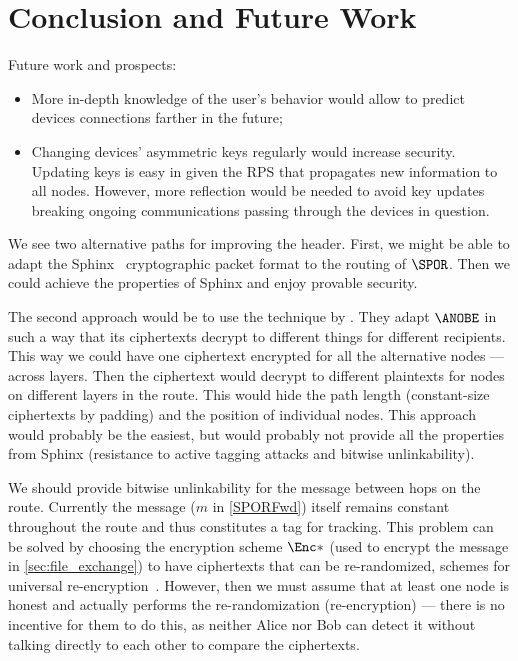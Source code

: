 \section{Conclusion and Future Work}

 Future work and prospects:
\begin{itemize}
	\item More in-depth knowledge of the user's behavior would allow to predict devices connections farther in the future;
	\item Changing devices' asymmetric keys regularly would increase security.
	Updating keys is easy in \name given the RPS that propagates new information to all nodes.
	However, more reflection would be needed to avoid key updates breaking ongoing communications passing through the devices in question.

\end{itemize}

We see two alternative paths for improving the header.
First, we might be able to adapt the Sphinx~\cite{Sphinx} cryptographic packet 
format to the routing of \(\SPOR\).
Then we could achieve the properties of Sphinx and enjoy provable security.

The second approach would be to use the technique by \textcite{PPACinPubFS}.
They adapt \(\ANOBE\) in such a way that its ciphertexts decrypt to different 
things for different recipients.
This way we could have one ciphertext encrypted for all the alternative nodes 
--- across layers.
Then the ciphertext would decrypt to different plaintexts for nodes on different 
layers in the route.
This would hide the path length (constant-size ciphertexts by padding) and the 
position of individual nodes.
This approach would probably be the easiest, but would probably not provide all 
the properties from Sphinx (\eg resistance to active tagging attacks and bitwise 
unlinkability).

We should provide bitwise unlinkability for the message between hops on the 
route.
Currently the message (\(m\) in \cref{SPORFwd}) itself remains constant 
throughout the route and thus constitutes a tag for tracking.
This problem can be solved by choosing the encryption scheme \(\Enc*\) (used to 
encrypt the message in \cref{sec:file_exchange}) to have ciphertexts that can be 
re-randomized, \eg schemes for universal 
re-encryption~\cite{UniversalReencryption}.
However, then we must assume that at least one node is honest and actually 
performs the re-randomization (re-encryption) --- there is no incentive for them 
to do this, as neither Alice nor Bob can detect it without talking directly to 
each other to compare the ciphertexts.
